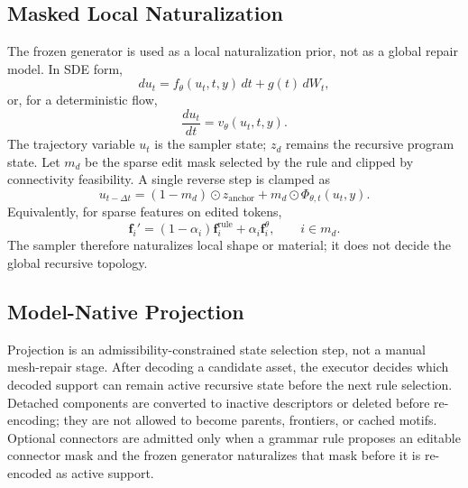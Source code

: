 \documentclass[sigconf,anonymous,review]{acmart}
\begin{document}
\subsection{Masked Local Naturalization}
The frozen generator is used as a local naturalization prior, not as a global repair model. In SDE form,
\begin{equation}
du_t=f_\theta(u_t,t,y)\,dt+g(t)\,dW_t,
\end{equation}
or, for a deterministic flow,
\begin{equation}
\frac{d u_t}{dt}=v_\theta(u_t,t,y).
\end{equation}
The trajectory variable $u_t$ is the sampler state; $z_d$ remains the recursive program state. Let $m_d$ be the sparse edit mask selected by the rule and clipped by connectivity feasibility. A single reverse step is clamped as
\begin{equation}
u_{t-\Delta t}=
(1-m_d)\odot z_{\mathrm{anchor}}
+m_d\odot\Phi_{\theta,t}(u_t,y).
\label{eq:masked-flow-clamp}
\end{equation}
Equivalently, for sparse features on edited tokens,
\begin{equation}
\mathbf f_i'=
(1-\alpha_i)\mathbf f_i^{\mathrm{rule}}
+\alpha_i\mathbf f_i^{\theta},
\qquad i\in m_d.
\end{equation}
The sampler therefore naturalizes local shape or material; it does not decide the global recursive topology.

\subsection{Model-Native Projection}
Projection is an admissibility-constrained state selection step, not a manual mesh-repair stage. After decoding a candidate asset, the executor decides which decoded support can remain active recursive state before the next rule selection. Detached components are converted to inactive descriptors or deleted before re-encoding; they are not allowed to become parents, frontiers, or cached motifs. Optional connectors are admitted only when a grammar rule proposes an editable connector mask and the frozen generator naturalizes that mask before it is re-encoded as active support.
\end{document}
